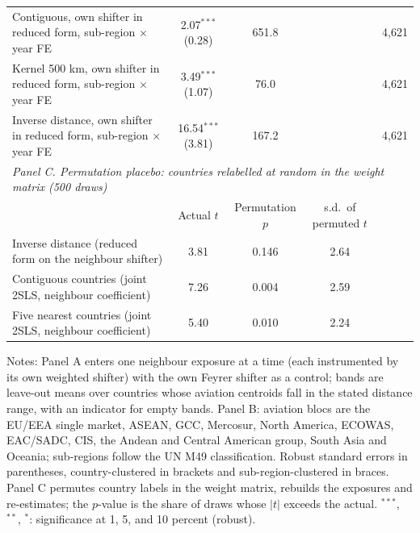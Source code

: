 \documentclass[12pt]{article}
\begin{document}
\begin{table}[htbp]
\begin{threeparttable}
\begin{tabular}{lcccc}
  Contiguous, own shifter in reduced form, sub-region $\times$ year FE & 2.07$^{***}$ (0.28) & 651.8 & & 4,621 \\
  Kernel 500 km, own shifter in reduced form, sub-region $\times$ year FE & 3.49$^{***}$ (1.07) & 76.0 & & 4,621 \\
  Inverse distance, own shifter in reduced form, sub-region $\times$ year FE & 16.54$^{***}$ (3.81) & 167.2 & & 4,621 \\
\midrule
\multicolumn{5}{l}{\textit{Panel C. Permutation placebo: countries relabelled at random in the weight matrix (500 draws)}} \\
 & Actual $t$ & Permutation $p$ & s.d.\ of permuted $t$ & \\
  Inverse distance (reduced form on the neighbour shifter) & 3.81 & 0.146 & 2.64 & \\
  Contiguous countries (joint 2SLS, neighbour coefficient) & 7.26 & 0.004 & 2.59 & \\
  Five nearest countries (joint 2SLS, neighbour coefficient) & 5.40 & 0.010 & 2.24 & \\
\bottomrule
\end{tabular}
\begin{tablenotes}[flushleft]
\scriptsize
\item Notes: Panel A enters one neighbour exposure at a time (each instrumented by its own weighted shifter) with the own Feyrer shifter as a control; bands are leave-out means over countries whose aviation centroids fall in the stated distance range, with an indicator for empty bands. Panel B: aviation blocs are the EU/EEA single market, ASEAN, GCC, Mercosur, North America, ECOWAS, EAC/SADC, CIS, the Andean and Central American group, South Asia and Oceania; sub-regions follow the UN M49 classification. Robust standard errors in parentheses, country-clustered in brackets and sub-region-clustered in braces. Panel C permutes country labels in the weight matrix, rebuilds the exposures and re-estimates; the $p$-value is the share of draws whose $|t|$ exceeds the actual. $^{***}$, $^{**}$, $^{*}$: significance at 1, 5, and 10 percent (robust).
\end{tablenotes}
\end{threeparttable}
\end{table}
\end{document}
